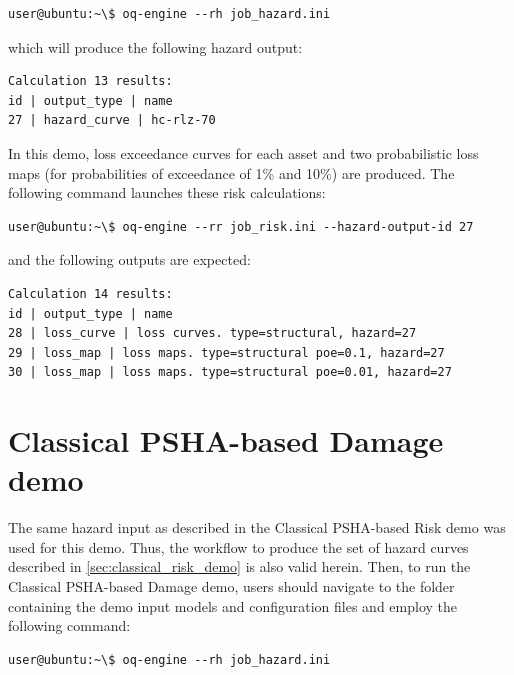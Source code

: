 \begin{Verbatim}[frame=single, commandchars=\\\{\}, samepage=true]
user@ubuntu:~\$ oq-engine --rh job_hazard.ini
\end{Verbatim}

which will produce the following hazard output:

\begin{Verbatim}[frame=single, commandchars=\\\{\}, samepage=true]
Calculation 13 results:
id | output_type | name
27 | hazard_curve | hc-rlz-70
\end{Verbatim}

In this demo, loss exceedance curves for each asset and two probabilistic loss maps (for probabilities of exceedance of 1\% and 10\%) are produced. The following command launches these risk calculations:

\begin{Verbatim}[frame=single, commandchars=\\\{\}, samepage=true]
user@ubuntu:~\$ oq-engine --rr job_risk.ini --hazard-output-id 27
\end{Verbatim}

and the following outputs are expected:

\begin{Verbatim}[frame=single, commandchars=\\\{\}, samepage=true]
Calculation 14 results:
id | output_type | name
28 | loss_curve | loss curves. type=structural, hazard=27
29 | loss_map | loss maps. type=structural poe=0.1, hazard=27
30 | loss_map | loss maps. type=structural poe=0.01, hazard=27
\end{Verbatim}

\section{Classical PSHA-based Damage demo}
\label{sec:classical_damage_demo}
The same hazard input as described in the Classical PSHA-based Risk demo was used for this demo. Thus, the workflow to produce the set of hazard curves described in \ref{sec:classical_risk_demo} is also valid herein. Then, to run the Classical PSHA-based Damage demo, users should navigate to the folder containing the demo input models and configuration files and employ the following command:

\begin{Verbatim}[frame=single, commandchars=\\\{\}, samepage=true]
user@ubuntu:~\$ oq-engine --rh job_hazard.ini
\end{Verbatim}

